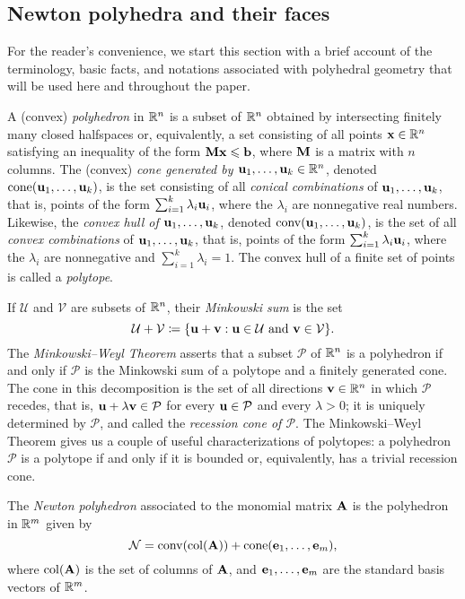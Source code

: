 \documentclass{amsart}
\begin{document}
\subsection{Newton polyhedra and their faces}

For the reader's convenience, we start this section with a brief account of the terminology, basic facts, and notations associated with polyhedral geometry that will be used here and throughout the paper.

A (convex) \emph{polyhedron} in $\mathbb{R}^n$ is a subset of $\mathbb{R}^n$ obtained by intersecting finitely many closed halfspaces or, equivalently, a set consisting of all points $\mathbf{x}\in \mathbb{R}^n$ satisfying an inequality of the form $\mathbf{M}\mathbf{x}\leqslant \mathbf{b}$, where $\mathbf{M}$ is a matrix with $n$ columns.
The (convex) \emph{cone generated by $\mathbf{u}_1,\ldots,\mathbf{u}_k \in \mathbb{R}^n$}, denoted $\operatorname{cone}(\mathbf{u}_1,\ldots,\mathbf{u}_k)$, is the set consisting of all \emph{conical combinations} of $\mathbf{u}_1, \ldots, \mathbf{u}_k$, that is, points of the form $\sum_{i=1}^k \lambda_i \mathbf{u}_i$, where the $\lambda_i$ are nonnegative real numbers.
Likewise, the \emph{convex hull of $\mathbf{u}_1,\ldots,\mathbf{u}_k$}, denoted $\operatorname{conv}(\mathbf{u}_1,\ldots,\mathbf{u}_k)$, is the set of all \emph{convex combinations} of $\mathbf{u}_1, \ldots, \mathbf{u}_k$, that is, points of the form $\sum_{i=1}^k \lambda_i \mathbf{u}_i$, where the $\lambda_i$ are nonnegative and $\sum_{i=1}^k \lambda_i = 1$.
The convex hull of a finite set of points is called a \emph{polytope}.

If $\mathcal{U}$ and $\mathcal{V}$ are subsets of $\mathbb{R}^n$, their \emph{Minkowski sum} is the set
\[\mathcal{U}+\mathcal{V} \coloneqq \{\mathbf{u}+\mathbf{v}: \mathbf{u}\in \mathcal{U}\text{ and }\mathbf{v}\in \mathcal{V}\}.\]
The \emph{Minkowski--Weyl Theorem} asserts that a subset $\mathcal{P}$ of $\mathbb{R}^n$ is a polyhedron if and only if $\mathcal{P}$ is the Minkowski sum of a polytope and a finitely generated cone.
The cone in this decomposition is the set of all directions $\mathbf{v} \in \mathbb{R}^n$ in which $\mathcal{P}$ recedes, that is, $\mathbf{u} + \lambda \mathbf{v} \in \mathcal{P}$ for every $\mathbf{u} \in \mathcal{P}$ and every $\lambda > 0$; it is uniquely determined by $\mathcal{P}$, and called the \emph{recession cone of $\mathcal{P}$}.
The Minkowski--Weyl Theorem gives us a couple of useful characterizations of polytopes: a polyhedron $\mathcal{P}$ is a polytope if and only if it is bounded or, equivalently, has a trivial recession cone.

\begin{definition}
The \emph{Newton polyhedron} associated to the monomial matrix $\mathbf{A}$ is the polyhedron in $\mathbb{R}^m$ given by
\[ \mathcal{N} = \operatorname{conv}( \operatorname{col}(\mathbf{A}) ) + \operatorname{cone}( \mathbf{e}_1, \ldots, \mathbf{e}_m), \]
where $\operatorname{col}(\mathbf{A})$ is the set of columns of $\mathbf{A}$, and $\mathbf{e}_1, \ldots, \mathbf{e}_m$ are the standard basis vectors of $\mathbb{R}^m$.
\end{definition}
\end{document}
